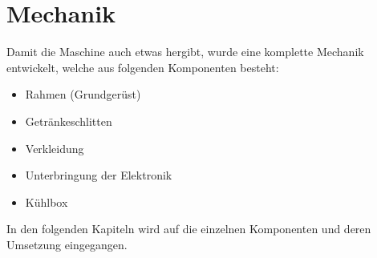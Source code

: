 \section{Mechanik}
\label{sec:Mechanik}

Damit die Maschine auch etwas hergibt, wurde eine komplette Mechanik entwickelt, welche aus folgenden Komponenten besteht: 

\begin{itemize}
\item Rahmen (Grundgerüst)
\item Getränkeschlitten 
\item Verkleidung
\item Unterbringung der Elektronik
\item Kühlbox
\end{itemize}

In den folgenden Kapiteln wird auf die einzelnen Komponenten und deren Umsetzung eingegangen.